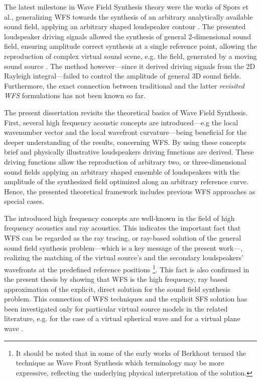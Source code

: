 The latest milestone in Wave Field Synthesis theory were the works of Spors et al., generalizing WFS towards the synthesis of an arbitrary analytically available sound field, applying an arbitrary shaped loudspeaker contour \cite{Spors2008:WFSrevisited, Rabenstein2007}.
The presented loudspeaker driving signals allowed the synthesis of general 2-dimensional sound field, ensuring amplitude correct synthesis at a single reference point,
allowing the reproduction of complex virtual sound scene, e.g. the field, generated by a moving sound source \cite{Ahrens2008moving, Ahrens2008moving_b, Ahrens2011_moving_source_WFS}.
The method however---since it derived driving signals from the 2D Rayleigh integral---failed to control the amplitude of general 3D sound fields.
Furthermore, the exact connection between traditional and the latter \emph{revisited WFS} formulations has not been known so far.

\vspace{3mm}
The present dissertation revisits the theoretical basics of Wave Field Synthesis.
First, several high frequency acoustic concepts are introduced---e.g the local wavenumber vector and the local wavefront curvature---being beneficial for the deeper understanding of the results, concerning WFS.
By using these concepts brief and physically illustrative loudspeakers driving functions are derived.
These driving functions allow the reproduction of arbitrary two, or three-dimensional sound fields applying an arbitrary shaped ensemble of loudspeakers with the amplitude of the synthesized field optimized along an arbitrary reference curve.
Hence, the presented theoretical framework includes previous WFS approaches as special cases.

The introduced high frequency concepts are well-known in the field of high frequency acoustics and ray acoustics.
This indicates the important fact that WFS can be regarded as the ray tracing, or ray-based solution of the general sound field synthesis problem---which is a key message of the present work---, realizing the matching of the virtual source's and the secondary loudspeakers' wavefronts at the predefined reference positions \footnote{It should be noted that in some of the early works of Berkhout termed the technique as Wave Front Synthesis \cite{berkhout1992wave, doi:10.1121/1.404755} which terminology may be more expressive, reflecting the underlying physical interpretation of the solution.}.
This fact is also confirmed in the present thesis by showing that WFS is the high frequency, ray based approximation of the explicit, direct solution for the sound field synthesis problem.
This connection of WFS techniques and the explicit SFS solution has been investigated only for particular virtual source models in the related literature, e.g. for the case of a virtual spherical wave \cite{Spors2010:analysis_and_improvement} and for a virtual plane wave \cite{Schultz2016:DAGA}.

